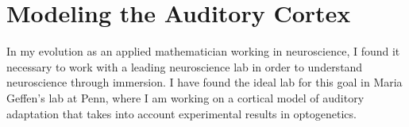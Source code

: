 \documentclass[a4paper,11pt]{article}
\begin{document}
%  
%  



\section{Modeling the Auditory Cortex}
In my evolution as an applied mathematician working in neuroscience, I found it necessary to work with a leading neuroscience lab in order to understand neuroscience through immersion. I have found the ideal lab for this goal in Maria Geffen's lab at Penn, where I am working on a cortical model of auditory adaptation that takes into account experimental results in optogenetics.

\end{document}
